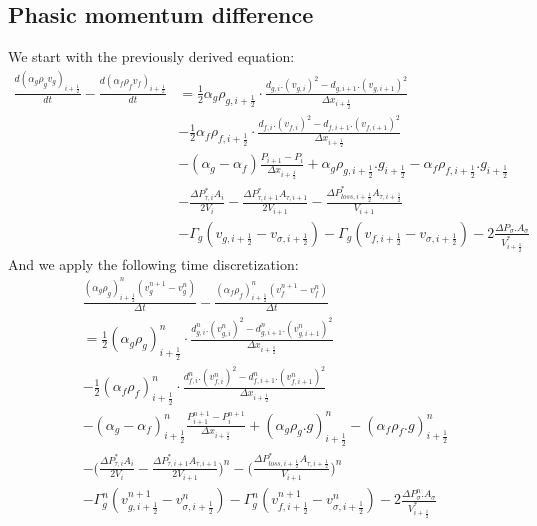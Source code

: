 \documentclass[11pt,letterpaper,titlepage]{article}
\newcommand{\half}{\frac{1}{2}}
\begin{document}
\subsection{Phasic momentum difference}
We start with the previously derived equation:
\begin{equation*}
\begin{aligned}
\frac{d(\alpha_g\rho_g v_g)_{i+\half}}{dt}-\frac{d(\alpha_f\rho_f v_f)_{i+\half}}{dt}
&=\half \alpha_g \rho_{g,i+\half} \cdot\frac{d_{g,i}.(v_{g,i})^2-d_{g,i+1}.(v_{g,i+1})^2}{\Delta x_{i+\half}} \\
&-\half \alpha_f \rho_{f,i+\half} \cdot\frac{d_{f,i}.(v_{f,i})^2-d_{f,i+1}.(v_{f,i+1})^2}{\Delta x_{i+\half}} \\
&-(\alpha_g-\alpha_f)\frac{P_{i+1}-P_i}{\Delta x_{i+\half}} + \alpha_g \rho_{g,i+\half}.g_{i+\half} - \alpha_f\rho_{f,i+\half}.g_{i+\half}\\
&-\frac{\Delta P_{\tau,i}^*A_i}{2V_i}-\frac{\Delta P_{\tau,i+1}^*A_{\tau,i+1}}{2V_{i+1}} 
-\frac{\Delta P_{loss,i+\half}^*A_{\tau,i+\half}}{V_{i+1}}\\
& - \Gamma_g (v_{g,i+\half} - v_{\sigma,i+\half})- \Gamma_g (v_{f,i+\half} - v_{\sigma,i+\half})-2\frac{\Delta P_{\sigma}.A_{\sigma}}{V_{i+\half}^*}
\end{aligned}
\end{equation*}
\newline
\noindent
And we apply the following time discretization:
\begin{equation} \label{eq:diffmomm}
\begin{aligned}
&\frac{(\alpha_g\rho_g )_{i+\half}^n (v_g^{n+1} -v_g^{n})}{\Delta t}
-\frac{(\alpha_f\rho_f )_{i+\half}^n (v_f^{n+1} -v_f^{n})}{\Delta t}\\
&=\half (\alpha_g \rho_{g})_{i+\half}^n \cdot\frac{d_{g,i}^n.(v_{g,i}^n)^2-d_{g,i+1}^n.(v_{g,i+1}^n)^2}{\Delta x_{i+\half}} \\
&-\half (\alpha_f \rho_{f})_{i+\half}^n \cdot\frac{d_{f,i}^n.(v_{f,i}^n)^2-d_{f,i+1}^n.(v_{f,i+1}^n)^2}{\Delta x_{i+\half}} \\
&-(\alpha_g-\alpha_f)_{i+\half}^n\frac{P_{i+1}^{n+1}-P_i^{n+1} }{\Delta x_{i+\half}} + (\alpha_g \rho_{g}.g)_{i+\half}^n - (\alpha_f \rho_{f}.g)_{i+\half}^n \\
&-\biggr(\frac{\Delta P_{\tau,i}^*A_i}{2V_i}-\frac{\Delta P_{\tau,i+1}^*A_{\tau,i+1}}{2V_{i+1}}\biggr)^n 
-\biggr(\frac{\Delta P_{loss,i+\half}^*A_{\tau,i+\half}}{V_{i+1}}\biggr)^n\\
& - \Gamma_g^n (v_{g,i+\half}^{n+1} - v_{\sigma,i+\half}^n)- \Gamma_g^n (v_{f,i+\half}^{n+1} - v_{\sigma,i+\half}^n)-2\frac{\Delta P_{\sigma}^n.A_{\sigma}}{V_{i+\half}^*}
\end{aligned}
\end{equation}
\newline
\noindent
\end{document}
